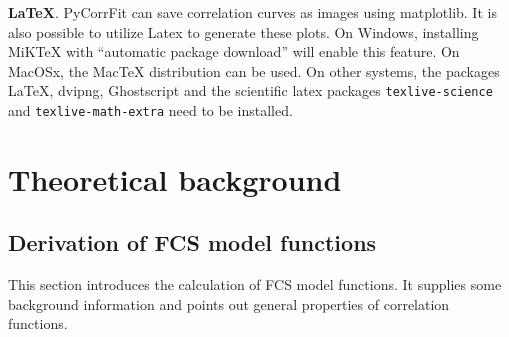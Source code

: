 \noindent \textbf{\LaTeX}.
PyCorrFit can save correlation curves as images using matplotlib. It is also possible to utilize Latex to generate these plots. On Windows, installing MiKTeX  with ``automatic package download'' will enable this feature. On MacOSx, the MacTeX distribution can be used. On other systems, the packages LaTeX, dvipng, Ghostscript and the scientific latex packages \texttt{texlive-science} and \texttt{texlive-math-extra} need to be installed.


\section{Theoretical background}


\subsection{Derivation of FCS model functions}
This section introduces the calculation of FCS model functions. It supplies some background information and points out general properties of correlation functions.
	
